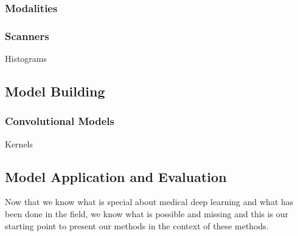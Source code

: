         \subsubsection{Modalities}
        \subsubsection{Scanners}
            Histograms
    \subsection{Model Building}
        \subsubsection{Convolutional Models}
            Kernels

    \subsection{Model Application and Evaluation}

    Now that we know what is special about medical deep learning and what has been done in the field, we know what is possible and missing and this is our starting point to present our methods in the context of these methods.